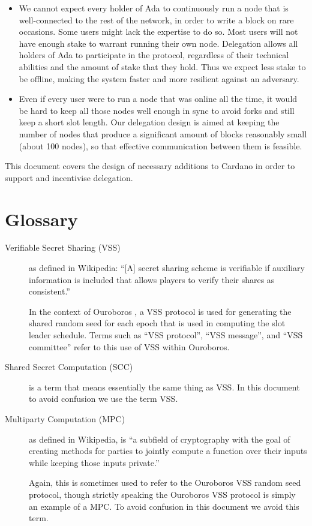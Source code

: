 \documentclass[11pt,a4paper]{article}
\begin{document}
\begin{itemize}
\item
  We cannot expect every holder of Ada to continuously run a node that
  is well-connected to the rest of the network, in order to write a
  block on rare occasions. Some users might lack the expertise to do so.
  Most users will not have enough stake to warrant running their own
  node. Delegation allows all holders of Ada to participate in the
  protocol, regardless of their technical abilities and the amount of
  stake that they hold. Thus we expect less stake to be offline, making
  the system faster and more resilient against an adversary.
\item
  Even if every user were to run a node that was online all the time, it
  would be hard to keep all those nodes well enough in sync to avoid
  forks and still keep a short slot length. Our delegation design is
  aimed at keeping the number of nodes that produce a significant amount
  of blocks reasonably small (about 100 nodes), so that effective
  communication between them is feasible.
\end{itemize}

This document covers the design of necessary additions to Cardano in
order to support and incentivise delegation.

\section{Glossary}\label{glossary}

\begin{description}
\item[Verifiable Secret Sharing (VSS)] as defined in Wikipedia: ``[A] secret
  sharing scheme is verifiable if auxiliary information is included that
  allows players to verify their shares as consistent.''

  In the context of Ouroboros \citep{ouroboros_classic}, a VSS protocol is used
  for generating the shared random seed for each epoch that is used in
  computing the slot leader schedule. Terms such as ``VSS protocol'',
  ``VSS message'', and ``VSS committee'' refer to this use of VSS within
  Ouroboros.

\item[Shared Secret Computation (SCC)] is a term that means essentially the
  same thing as VSS. In this document to avoid confusion we use the term VSS.

\item[Multiparty Computation (MPC)] as defined in Wikipedia, is ``a subfield
  of cryptography with the goal of creating methods for parties to jointly
  compute a function over their inputs while keeping those inputs private.''

  Again, this is sometimes used to refer to the Ouroboros VSS random seed
  protocol, though strictly speaking the Ouroboros VSS protocol is simply an
  example of a MPC. To avoid confusion in this document we avoid this term.
\end{description}
\end{document}
